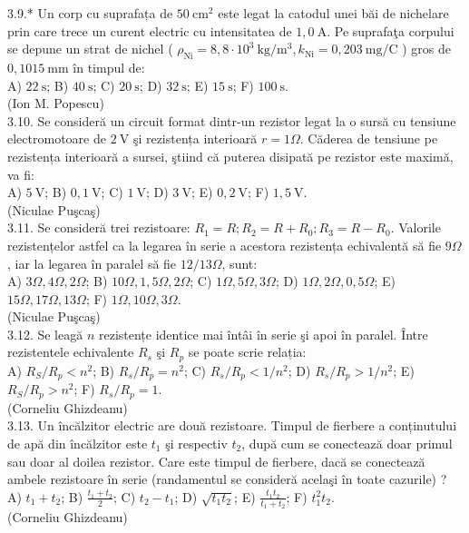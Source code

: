 3.9.* Un corp cu suprafața de $50 \mathrm{~cm}^{2}$ este legat la catodul unei băi de nichelare prin care trece un curent electric cu intensitatea de $1,0 \mathrm{~A}$. Pe suprafaţa corpului se depune un strat de nichel ( $\rho_{\mathrm{Ni}}=8,8 \cdot 10^{3} \mathrm{~kg} / \mathrm{m}^{3}, k_{\mathrm{Ni}}=0,203 \mathrm{~mg} / \mathrm{C}$ ) gros de $0,1015 \mathrm{~mm}$ în timpul de:\\ A) $22 \mathrm{~s}$; B) $40 \mathrm{~s}$; C) $20 \mathrm{~s}$; D) $32 \mathrm{~s}$; E) $15 \mathrm{~s}$; F) $100 \mathrm{~s}$.\\ (Ion M. Popescu)\\

3.10. Se consideră un circuit format dintr-un rezistor legat la o sursă cu tensiune electromotoare de $2 \mathrm{~V}$ şi rezistența interioară $r=1 \Omega$. Căderea de tensiune pe rezistența interioară a sursei, ştiind că puterea disipată pe rezistor este maximă, va fi:\\ A) $5 \mathrm{~V}$; B) $0,1 \mathrm{~V}$; C) $1 \mathrm{~V}$; D) $3 \mathrm{~V}$; E) $0,2 \mathrm{~V}$; F) $1,5 \mathrm{~V}$.\\ (Niculae Puşcaş)\\

3.11. Se consideră trei rezistoare: $R_{1}=R ; R_{2}=R+R_{0} ; R_{3}=R-R_{0}$. Valorile rezistențelor astfel ca la legarea în serie a acestora rezistența echivalentă să fie $9 \Omega$, iar la legarea în paralel să fie $12 / 13 \Omega$, sunt:\\ A) $3 \Omega , 4 \Omega , 2 \Omega$; B) $10 \Omega , 1,5 \Omega , 2 \Omega$; C) $1 \Omega , 5 \Omega , 3 \Omega$; D) $1 \Omega , 2 \Omega , 0,5 \Omega$; E) $15 \Omega , 17 \Omega , 13 \Omega$; F) $1 \Omega , 10 \Omega , 3 \Omega$.\\ (Niculae Puşcaş)\\

3.12. Se leagă $n$ rezistențe identice mai întâi în serie şi apoi în paralel. Între rezistentele echivalente $R_{s}$ şi $R_{p}$ se poate scrie relația:\\ A) $R_{S} / R_{p}<n^{2}$; B) $R_{s} / R_{p}=n^{2}$; C) $R_{s} / R_{p}<1 / n^{2}$; D) $R_{s} / R_{p}>1 / n^{2}$; E) $R_{S} / R_{p}>n^{2}$; F) $R_{s} / R_{p}=1$.\\ (Corneliu Ghizdeanu)\\

3.13. Un încălzitor electric are două rezistoare. Timpul de fierbere a conținutului de apă din încălzitor este $t_{1}$ şi respectiv $t_{2}$, după cum se conectează doar primul sau doar al doilea rezistor. Care este timpul de fierbere, dacă se conectează ambele rezistoare în serie (randamentul se consideră acelaşi în toate cazurile) ?\\ A) $t_{1}+t_{2}$; B) $\frac{t_{1}+t_{2}}{2}$; C) $t_{2}-t_{1}$; D) $\sqrt{t_{1} t_{2}}$; E) $\frac{t_{1} t_{2}}{t_{1}+t_{2}}$; F) $t_{1}^{2} t_{2}$.\\ (Corneliu Ghizdeanu)\\

